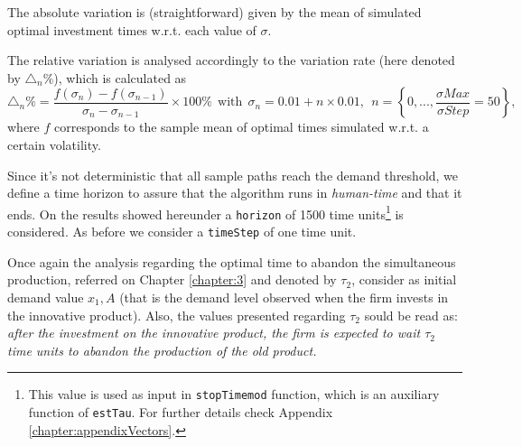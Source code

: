 
The absolute variation is (straightforward) given by the mean of simulated optimal investment times w.r.t. each value of $\sigma$.

The relative variation is analysed accordingly to the variation rate (here denoted by $\triangle_n \% $), which is calculated as
\begin{equation}
\triangle_n \% = \frac{f(\sigma_n)-f(\sigma_{n-1})}{\sigma_n-\sigma_{n-1}} \times 100 \% \  \ \text{with} \ \ \sigma_n=0.01+n\times0.01, \ \ n=\left\lbrace 0,..., \frac{\sigma Max}{\sigma Step}=50 \right\rbrace,
\label{var}
\end{equation}
where $f$ corresponds to the sample mean of optimal times simulated w.r.t. a certain volatility.

Since it's not deterministic that all sample paths reach the demand threshold, we define a time horizon to assure that the algorithm runs in \textit{human-time} and that it ends. On the results showed hereunder a \texttt{horizon} of 1500 time units\footnote{This value is used as input in \texttt{stopTimemod} function, which is an auxiliary function of \texttt{estTau}. For further details check Appendix \ref{chapter:appendixVectors}.} is considered. As before we consider a \texttt{timeStep} of one time unit.

Once again the analysis regarding the optimal time to abandon the simultaneous production, referred on Chapter \ref{chapter:3} and denoted by $\tau_2$, consider as initial demand value $x_1,A$ (that is the demand level observed when the firm invests in the innovative product). Also, the values presented regarding $\tau_2$ sould be read as: \textit{after the investment on the innovative product, the firm is expected to wait $\tau_2$ time units to abandon the production of the old product.}




